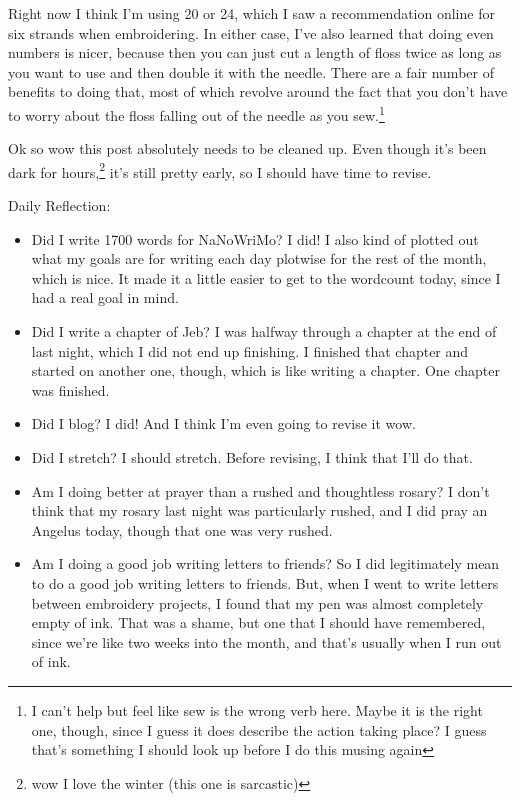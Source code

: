 \documentclass[12pt]{article}[titlepage]
\newcommand{\1}{\={a}}
\newcommand{\2}{\={e}}
\newcommand{\3}{\={\i}}
\newcommand{\4}{\=o}
\newcommand{\5}{\=u}
\newcommand{\6}{\={A}}
\renewcommand{\,}{\textsuperscript{,}}
\begin{document}
Right now I think I'm using 20 or 24, which I saw a recommendation online for six strands when embroidering.
In either case, I've also learned that doing even numbers is nicer, because then you can just cut a length of floss twice as long as you want to use and then double it with the needle.
There are a fair number of benefits to doing that, most of which revolve around the fact that you don't have to worry about the floss falling out of the needle as you sew.\footnote{I can't help but feel like sew is the wrong verb here.
Maybe it is the right one, though, since I guess it does describe the action taking place? I guess that's something I should look up before I do this musing again}

Ok so wow this post absolutely needs to be cleaned up.
Even though it's been dark for hours,\footnote{wow I love the winter (this one is sarcastic)} it's still pretty early, so I should have time to revise.

Daily Reflection:
\begin{itemize}
\item Did I write 1700 words for NaNoWriMo?
I did! I also kind of plotted out what my goals are for writing each day plotwise for the rest of the month, which is nice.
It made it a little easier to get to the wordcount today, since I had a real goal in mind.
\item Did I write a chapter of Jeb?
I was halfway through a chapter at the end of last night, which I did not end up finishing.
I finished that chapter and started on another one, though, which is like writing a chapter.
One chapter was finished.
\item Did I blog? I did! And I think I'm even going to revise it wow.
\item Did I stretch? I should stretch. Before revising, I think that I'll do that.
\item Am I doing better at prayer than a rushed and thoughtless rosary? I don't think that my rosary last night was particularly rushed, and I did pray an Angelus today, though that one was very rushed.
\item Am I doing a good job writing letters to friends?
So I did legitimately mean to do a good job writing letters to friends.
But, when I went to write letters between embroidery projects, I found that my pen was almost completely empty of ink.
That was a shame, but one that I should have remembered, since we're like two weeks into the month, and that's usually when I run out of ink.
\end{itemize}
\end{document}
